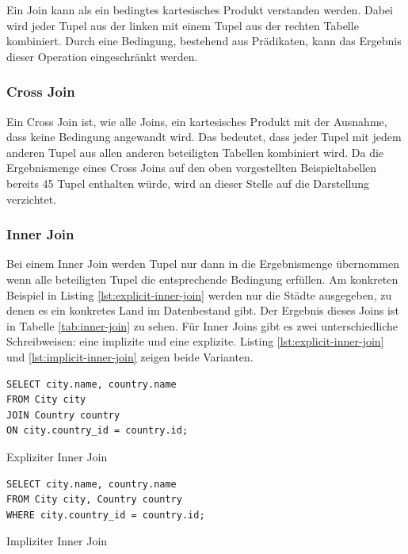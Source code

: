 \documentclass[a4paper]{article}
\begin{document}
Ein Join kann als ein bedingtes kartesisches Produkt verstanden werden. Dabei wird jeder Tupel aus der linken mit einem Tupel aus der rechten Tabelle kombiniert.  Durch eine Bedingung, bestehend aus Prädikaten, kann das Ergebnis dieser Operation eingeschränkt werden.

\subsubsection{Cross Join}
Ein Cross Join ist, wie alle Joins, ein kartesisches Produkt mit der Ausnahme, dass keine Bedingung angewandt wird. Das bedeutet, dass jeder Tupel mit jedem anderen Tupel aus allen anderen beteiligten Tabellen kombiniert wird. Da die Ergebnismenge eines Cross Joins auf den oben vorgestellten Beispieltabellen bereits 45 Tupel enthalten würde, wird an dieser Stelle auf die Darstellung verzichtet.

\newpage
\subsubsection{Inner Join}
Bei einem Inner Join werden Tupel nur dann in die Ergebnismenge übernommen wenn alle beteiligten Tupel die entsprechende Bedingung erfüllen. Am konkreten Beispiel in Listing \ref{lst:explicit-inner-join} werden nur die Städte ausgegeben, zu denen es ein konkretes Land im Datenbestand gibt. Der Ergebnis dieses Joins ist in Tabelle \ref{tab:inner-join} zu sehen. Für Inner Joins gibt es zwei unterschiedliche Schreibweisen: eine implizite und eine explizite. Listing \ref{lst:explicit-inner-join} und \ref{lst:implicit-inner-join} zeigen beide Varianten.

\begin{listing}[H]
\begin{verbatim}
SELECT city.name, country.name 
FROM City city 
JOIN Country country 
ON city.country_id = country.id;
\end{verbatim}
\caption{Expliziter Inner Join}
\label{lst:explicit-inner-join}
\end{listing}

\begin{listing}[H]
\begin{verbatim}
SELECT city.name, country.name 
FROM City city, Country country 
WHERE city.country_id = country.id;
\end{verbatim}
\caption{Impliziter Inner Join}
\label{lst:implicit-inner-join}
\end{listing}
\end{document}
